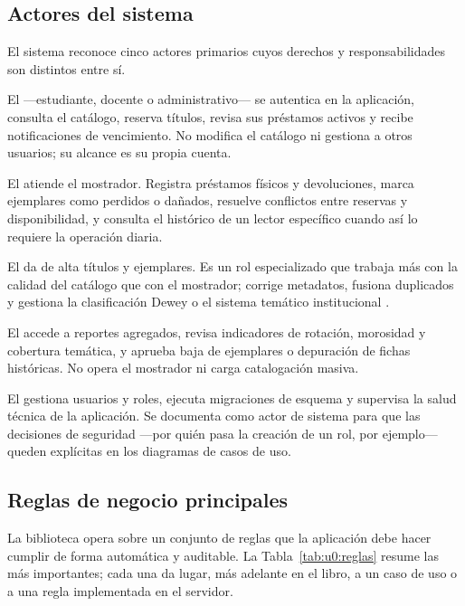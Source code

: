 \subsection{Actores del sistema}
\label{sec:u0:dominio:actores}

El sistema reconoce cinco actores primarios cuyos derechos y responsabilidades son distintos entre s\'i.

El  ---estudiante, docente o administrativo--- se autentica en la aplicaci\'on, consulta el cat\'alogo, reserva t\'itulos, revisa sus pr\'estamos activos y recibe notificaciones de vencimiento. No modifica el cat\'alogo ni gestiona a otros usuarios; su alcance es su propia cuenta.

El  atiende el mostrador. Registra pr\'estamos f\'isicos y devoluciones, marca ejemplares como perdidos o da\~nados, resuelve conflictos entre reservas y disponibilidad, y consulta el hist\'orico de un lector espec\'ifico cuando as\'i lo requiere la operaci\'on diaria.

El  da de alta t\'itulos y ejemplares. Es un rol especializado que trabaja m\'as con la calidad del cat\'alogo que con el mostrador; corrige metadatos, fusiona duplicados y gestiona la clasificaci\'on Dewey o el sistema tem\'atico institucional \cite{sommerville2015se}.

El  accede a reportes agregados, revisa indicadores de rotaci\'on, morosidad y cobertura tem\'atica, y aprueba baja de ejemplares o depuraci\'on de fichas hist\'oricas. No opera el mostrador ni carga catalogaci\'on masiva.

El  gestiona usuarios y roles, ejecuta migraciones de esquema y supervisa la salud t\'ecnica de la aplicaci\'on. Se documenta como actor de sistema para que las decisiones de seguridad ---por qui\'en pasa la creaci\'on de un rol, por ejemplo--- queden expl\'icitas en los diagramas de casos de uso.

\subsection{Reglas de negocio principales}
\label{sec:u0:dominio:reglas}

La biblioteca opera sobre un conjunto de reglas que la aplicaci\'on debe hacer cumplir de forma autom\'atica y auditable. La Tabla~\ref{tab:u0:reglas} resume las m\'as importantes; cada una da lugar, m\'as adelante en el libro, a un caso de uso o a una regla implementada en el servidor.

